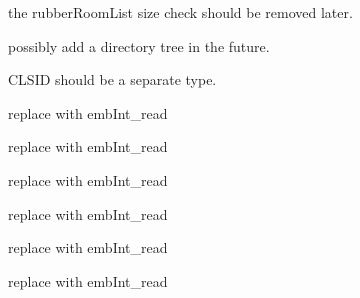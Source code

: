 
\begin{DoxyRefList}
\item[Global \mbox{\hyperlink{src_2main_8c_ae7e67339f8e559559f7b1940ed36e1b6}{allow\+\_\+rubber}} (void)]\label{todo__todo000042}%
%
the rubber\+Room\+List size check should be removed later.  
\item[Global \mbox{\hyperlink{embroidery__internal_8h_a5e0de54ec0ef10b88a4e499bbe94f869}{bcf\+\_\+directory}} ]\label{todo__todo000401}%
%
possibly add a directory tree in the future.  
\item[Global \mbox{\hyperlink{embroidery__internal_8h_a5226ee18f1045aa203f53da9b74d6963}{bcf\+\_\+file\+\_\+header}} ]\label{todo__todo000402}%
%
CLSID should be a separate type.  
\item[Global \mbox{\hyperlink{formats_8c_acaa069d2e820245be0f711415e2c297d}{binary\+Write\+Int}} (FILE $\ast$f, int data)]\label{todo__todo000417}%
%
replace with emb\+Int\+\_\+read  
\item[Global \mbox{\hyperlink{formats_8c_ad608ccee7fa2036aeba8500061ea0824}{binary\+Write\+Int\+BE}} (FILE $\ast$f, int data)]\label{todo__todo000418}%
%
replace with emb\+Int\+\_\+read  
\item[Global \mbox{\hyperlink{formats_8c_ab2256826c6ea8d2374fc94df46a7616f}{binary\+Write\+Short}} (FILE $\ast$f, short data)]\label{todo__todo000414}%
%
replace with emb\+Int\+\_\+read  
\item[Global \mbox{\hyperlink{formats_8c_ad56027171faded451118350359c1e8ae}{binary\+Write\+UInt}} (FILE $\ast$f, unsigned int data)]\label{todo__todo000419}%
%
replace with emb\+Int\+\_\+read  
\item[Global \mbox{\hyperlink{formats_8c_a152fc4262fce475f30786312da68fad6}{binary\+Write\+UInt\+BE}} (FILE $\ast$f, unsigned int data)]\label{todo__todo000420}%
%
replace with emb\+Int\+\_\+read  
\item[Global \mbox{\hyperlink{formats_8c_a760e806c16c1612a6b5ca5a26bc736d1}{binary\+Write\+UShort}} (FILE $\ast$f, unsigned short data)]\label{todo__todo000415}%
%
replace with emb\+Int\+\_\+read  
\item[Global \mbox{\hyperlink{formats_8c_ac93ea02c7dfc79fb81e7e7cc5acea14a}{binary\+Write\+UShort\+BE}} (FILE $\ast$f, unsigned short data)]\label{todo__todo000416}%

\end{DoxyRefList}
